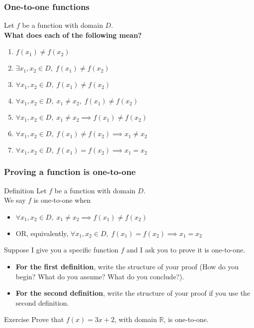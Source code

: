 \documentclass[14pt]{beamer}
\newcommand {\DS} [1] {${\displaystyle #1}$}
\newcommand {\R}{\mathbb{R}}
\newcommand{\p}{\pause}
\newcommand{\setsize}[1]{\fontsize{#1}{#1}\selectfont} %
\newcommand{\smallerfont}{\setsize{13}} %
\begin{document}
\begin{frame}
\frametitle{One-to-one functions}

Let $f$ be a function with domain $D$.  \\
{\bf What does each of the following mean?}
	\begin{enumerate}
		\item  \DS{f(x_1) \neq f(x_2)}
		\item  \DS{\exists x_1, x_2 \in D, \; f(x_1) \neq f(x_2)}
		\item  \DS{\forall x_1, x_2 \in D, \; f(x_1) \neq f(x_2)}
		\item  \DS{\forall x_1, x_2 \in D, \; x_1 \neq x_2, \; f(x_1) \neq f(x_2)}
		\item  \DS{\forall x_1, x_2 \in D, \; x_1 \neq x_2 \implies  f(x_1) \neq f(x_2)}
		\item  \DS{\forall x_1, x_2 \in D, \; f(x_1) \neq f(x_2) \implies  x_1 \neq x_2}
		\item  \DS{\forall x_1, x_2 \in D, \; f(x_1) = f(x_2) \implies x_1 = x_2}
	\end{enumerate}

\end{frame}

\begin{frame}
\frametitle{Proving a function is one-to-one}
\smallerfont

\begin{block}{Definition}
Let $f$ be a function with domain $D$. \\
We say $f$ is one-to-one when 
	\begin{itemize}
		\item   \hfill \DS{\forall x_1, x_2 \in D, \; x_1 \neq x_2 \implies  f(x_1) \neq f(x_2)}
		\item    OR, equivalently, \hfill  \DS{\forall x_1, x_2 \in D, \; f(x_1) = f(x_2) \implies x_1 = x_2}
	\end{itemize}
\end{block}

\vfill  \p

Suppose I give you a specific function $f$ and I ask you to prove it is one-to-one.  \pause
	\begin{itemize} 
		\item {\bf For the first definition}, write the structure of your proof (How do you begin? What do you assume? What do you conclude?).
		\item {\bf For the second definition}, write the structure of your proof if you use the second definition.
	\end{itemize}
	
\vfill	  \p

\begin{block}{Exercise}
	Prove that $f(x) = 3x + 2$, with domain $\R$, is one-to-one.
\end{block}

\end{frame}
\end{document}
